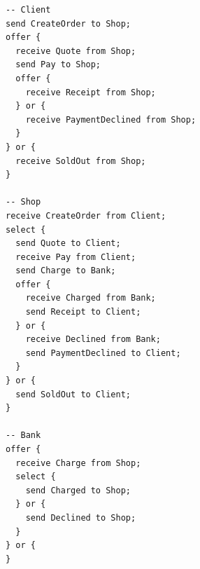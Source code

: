 \begin{lstlisting}[language={},basicstyle=\ttfamily\footnotesize,breaklines=true]
-- Client
send CreateOrder to Shop;
offer {
  receive Quote from Shop;
  send Pay to Shop;
  offer {
    receive Receipt from Shop;
  } or {
    receive PaymentDeclined from Shop;
  }
} or {
  receive SoldOut from Shop;
}

-- Shop
receive CreateOrder from Client;
select {
  send Quote to Client;
  receive Pay from Client;
  send Charge to Bank;
  offer {
    receive Charged from Bank;
    send Receipt to Client;
  } or {
    receive Declined from Bank;
    send PaymentDeclined to Client;
  }
} or {
  send SoldOut to Client;
}

-- Bank
offer {
  receive Charge from Shop;
  select {
    send Charged to Shop;
  } or {
    send Declined to Shop;
  }
} or {
}
\end{lstlisting}
